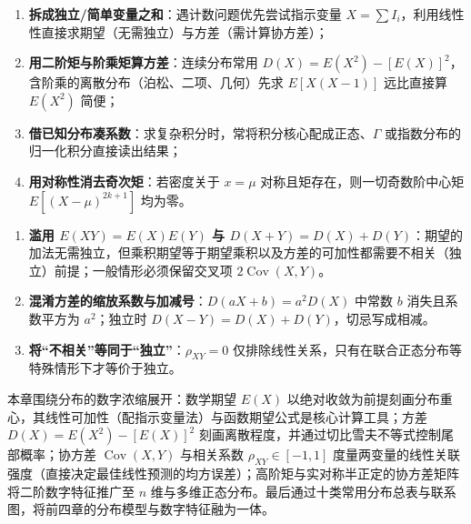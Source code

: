 \begin{method}[计算数字特征的四条高效路径]
\begin{enumerate}
  \item \textbf{拆成独立/简单变量之和}：遇计数问题优先尝试指示变量 $X=\sum I_i$，利用线性性直接求期望（无需独立）与方差（需计算协方差）；
  \item \textbf{用二阶矩与阶乘矩算方差}：连续分布常用 $D(X)=E(X^2)-[E(X)]^2$，含阶乘的离散分布（泊松、二项、几何）先求 $E[X(X-1)]$ 远比直接算 $E(X^2)$ 简便；
  \item \textbf{借已知分布凑系数}：求复杂积分时，常将积分核心配成正态、$\Gamma$ 或指数分布的归一化积分直接读出结果；
  \item \textbf{用对称性消去奇次矩}：若密度关于 $x=\mu$ 对称且矩存在，则一切奇数阶中心矩 $E[(X-\mu)^{2k+1}]$ 均为零。
\end{enumerate}
\end{method}

\begin{pitfall}[数字特征中的三类常见误区]
\begin{enumerate}
  \item \textbf{滥用 $E(XY)=E(X)E(Y)$ 与 $D(X+Y)=D(X)+D(Y)$}：期望的加法无需独立，但乘积期望等于期望乘积以及方差的可加性都需要不相关（独立）前提；一般情形必须保留交叉项 $2\operatorname{Cov}(X,Y)$。
  \item \textbf{混淆方差的缩放系数与加减号}：$D(aX+b)=a^2 D(X)$ 中常数 $b$ 消失且系数平方为 $a^2$；独立时 $D(X-Y)=D(X)+D(Y)$，切忌写成相减。
  \item \textbf{将“不相关”等同于“独立”}：$\rho_{XY}=0$ 仅排除线性关系，只有在联合正态分布等特殊情形下才等价于独立。
\end{enumerate}
\end{pitfall}

\begin{summary}[第四章核心脉络]
本章围绕分布的数字浓缩展开：数学期望 $E(X)$ 以绝对收敛为前提刻画分布重心，其线性可加性（配指示变量法）与函数期望公式是核心计算工具；方差 $D(X)=E(X^2)-[E(X)]^2$ 刻画离散程度，并通过切比雪夫不等式控制尾部概率；协方差 $\operatorname{Cov}(X,Y)$ 与相关系数 $\rho_{XY}\in[-1,1]$ 度量两变量的线性关联强度（直接决定最佳线性预测的均方误差）；高阶矩与实对称半正定的协方差矩阵将二阶数字特征推广至 $n$ 维与多维正态分布。最后通过十类常用分布总表与联系图，将前四章的分布模型与数字特征融为一体。
\end{summary}
